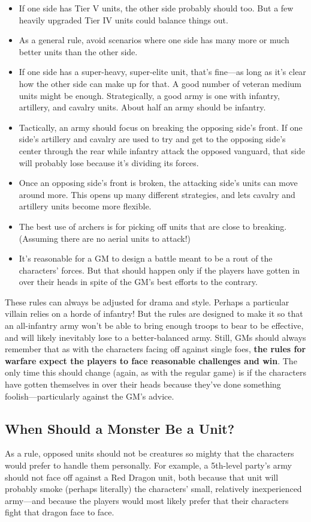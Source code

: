 \documentclass[10pt,a4paper,twoside,bg=print,twocolumn,openany,nodeprecatedcode]{dndbook}
\begin{document}
\begin{itemize}
\item If one side has Tier V units, the other side probably should too. But a few heavily upgraded Tier IV units could balance things out.
\item As a general rule, avoid scenarios where one side has many more or much better units than the other side.
\item If one side has a super-heavy, super-elite unit, that's fine—as long as it's clear how the other side can make up for that. A good number of veteran medium units might be enough. Strategically, a good army is one with infantry, artillery, and cavalry units. About half an army should be infantry.
\item Tactically, an army should focus on breaking the opposing side's front. If one side's artillery and cavalry are used to try and get to the opposing side's center through the rear while infantry attack the opposed vanguard, that side will probably lose because it's dividing its forces.
\item Once an opposing side's front is broken, the attacking side's units can move around more. This opens up many different strategies, and lets cavalry and artillery units become more flexible.
\item The best use of archers is for picking off units that are close to breaking. (Assuming there are no aerial units to attack!)
\item It's reasonable for a GM to design a battle meant to be a rout of the characters' forces. But that should happen only if the players have gotten in over their heads in spite of the GM's best efforts to the contrary.
\end{itemize}

These rules can always be adjusted for drama and style. Perhaps a particular villain relies on a horde of infantry! But the rules are designed to make it so that an all-infantry army won't be able to bring enough troops to bear to be effective, and will likely inevitably lose to a better-balanced army. Still, GMs should always remember that as with the characters facing off against single foes, \textbf{the rules for warfare expect the players to face reasonable challenges and win}. The only time this should change (again, as with the regular game) is if the characters have gotten themselves in over their heads because they've done something foolish—particularly against the GM's advice.

\subsection{When Should a Monster Be a Unit?}
As a rule, opposed units should not be creatures so mighty that the characters would prefer to handle them personally. For example, a 5th-level party's army should not face off against a Red Dragon unit, both because that unit will probably smoke (perhaps literally) the characters' small, relatively inexperienced army—and because the players would most likely prefer that their characters fight that dragon face to face.
\end{document}
